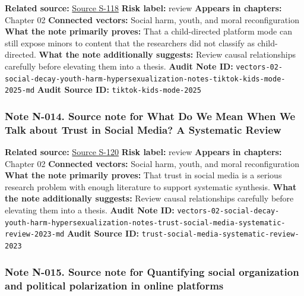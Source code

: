 \documentclass[
  american,
  11pt,
  letterpaper,
]{article}
\begin{document}
\textbf{Related source:}
\hyperref[source-s-118-when-kids-mode-isn-t-for-kids-investigating-tiktok-s-under-13-experience]{Source
S-118} \textbf{Risk label:} review \textbf{Appears in chapters:} Chapter
02 \textbf{Connected vectors:} Social harm, youth, and moral
reconfiguration \textbf{What the note primarily proves:} That a
child-directed platform mode can still expose minors to content that the
researchers did not classify as child-directed. \textbf{What the note
additionally suggests:} Review causal relationships carefully before
elevating them into a thesis. \textbf{Audit Note ID:}
\texttt{vectors-02-social-decay-youth-harm-hypersexualization-notes-tiktok-kids-mode-2025-md}
\textbf{Audit Source ID:} \texttt{tiktok-kids-mode-2025}

\subsubsection{Note N-014. Source note for What Do We Mean When We Talk
about Trust in Social Media? A Systematic
Review}\label{note-n-014-vectors-02-social-decay-youth-harm-hypersexualization-notes-trust-social-media-systematic-review-2023-md}

\textbf{Related source:}
\hyperref[source-s-120-what-do-we-mean-when-we-talk-about-trust-in-social-media-a-systematic-review]{Source
S-120} \textbf{Risk label:} review \textbf{Appears in chapters:} Chapter
02 \textbf{Connected vectors:} Social harm, youth, and moral
reconfiguration \textbf{What the note primarily proves:} That trust in
social media is a serious research problem with enough literature to
support systematic synthesis. \textbf{What the note additionally
suggests:} Review causal relationships carefully before elevating them
into a thesis. \textbf{Audit Note ID:}
\texttt{vectors-02-social-decay-youth-harm-hypersexualization-notes-trust-social-media-systematic-review-2023-md}
\textbf{Audit Source ID:}
\texttt{trust-social-media-systematic-review-2023}

\subsubsection{Note N-015. Source note for Quantifying social
organization and political polarization in online
platforms}\label{note-n-015-vectors-02-social-decay-youth-harm-hypersexualization-notes-waller-anderson-online-polarization-2020-md}
\end{document}
